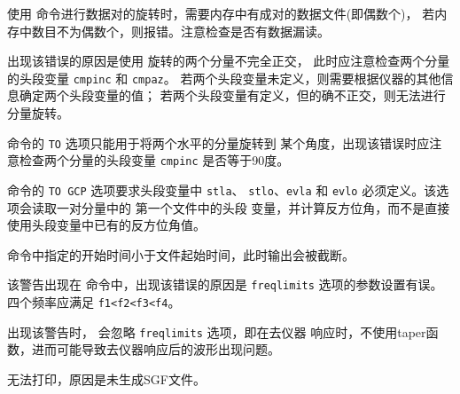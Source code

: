 使用  命令进行数据对的旋转时，需要内存中有成对的数据文件(即偶数个)，
若内存中数目不为偶数个，则报错。注意检查是否有数据漏读。

出现该错误的原因是使用  旋转的两个分量不完全正交，
此时应注意检查两个分量的头段变量 \texttt{cmpinc} 和 \texttt{cmpaz}。
若两个头段变量未定义，则需要根据仪器的其他信息确定两个头段变量的值；
若两个头段变量有定义，但的确不正交，则无法进行分量旋转。

 命令的 \texttt{TO} 选项只能用于将两个水平的分量旋转到
某个角度，出现该错误时应注意检查两个分量的头段变量 \texttt{cmpinc} 是否等于90度。

 命令的 \texttt{TO GCP} 选项要求头段变量中 \texttt{stla}、
\texttt{stlo}、\texttt{evla} 和 \texttt{evlo} 必须定义。该选项会读取一对分量中的
第一个文件中的头段
变量，并计算反方位角，而不是直接使用头段变量中已有的反方位角值。

 命令中指定的开始时间小于文件起始时间，此时输出会被截断。

该警告出现在  命令中，出现该错误的原因是 \texttt{freqlimits}
选项的参数设置有误。四个频率应满足 \texttt{f1<f2<f3<f4}。

出现该警告时， 会忽略 \texttt{freqlimits} 选项，即在去仪器
响应时，不使用taper函数，进而可能导致去仪器响应后的波形出现问题。

无法打印，原因是未生成SGF文件。
